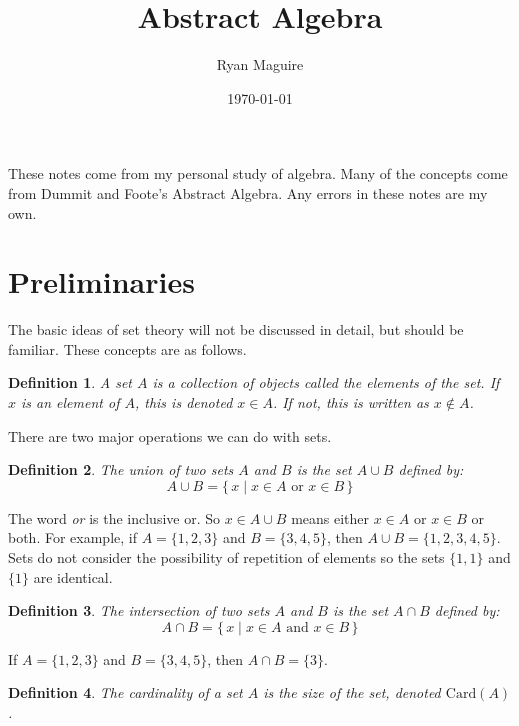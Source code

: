 \documentclass{article}
\title{Abstract Algebra}
\author{Ryan Maguire}
\date{\today}
\theoremstyle{plain}
\theoremstyle{normal}
\newtheorem{definition}{Definition}[section]
\begin{document}
    \maketitle
    These notes come from my personal study of algebra. Many of
    the concepts come from Dummit and Foote's Abstract Algebra.
    Any errors in these notes are my own.
    \tableofcontents
    \section{Preliminaries}
        The basic ideas of set theory will not be discussed in detail, but
        should be familiar. These concepts are as follows.
        \begin{definition}
            \label{def:set}%
            A \textit{set} $A$ is a collection of objects called the
            \textit{elements} of the set. If $x$ is an element of $A$, this is
            denoted $x\in{A}$. If not, this is written as $x\notin{A}$.
        \end{definition}
        There are two major operations we can do with sets.
        \begin{definition}
            \label{def:union}%
            The \textit{union} of two sets $A$ and $B$ is the set $A\cup{B}$
            defined by:
            \begin{equation}
                A\cup{B}=\{\,x\;|\;x\in{A}\textrm{ or }x\in{B}\,\}
            \end{equation}
        \end{definition}
        The word \textit{or} is the inclusive or. So $x\in{A}\cup{B}$ means
        either $x\in{A}$ or $x\in{B}$ or both.
        For example, if $A=\{1,2,3\}$ and $B=\{3,4,5\}$, then
        $A\cup{B}=\{1,2,3,4,5\}$. Sets do not consider the possibility of
        repetition of elements so the sets $\{1,1\}$ and $\{1\}$ are identical.
        \begin{definition}
            \label{def:intersection}%
            The \textit{intersection} of two sets $A$ and $B$ is the set
            $A\cap{B}$ defined by:
            \begin{equation}
                A\cap{B}=\{\,x\;|\;x\in{A}\textrm{ and }x\in{B}\,\}
            \end{equation}
        \end{definition}
        If $A=\{1,2,3\}$ and $B=\{3,4,5\}$, then $A\cap{B}=\{3\}$.
        \begin{definition}
            \label{def:cardinality}%
            The \textit{cardinality} of a set $A$ is the size of the set,
            denoted $\textrm{Card}(A)$.
        \end{definition}
\end{document}

